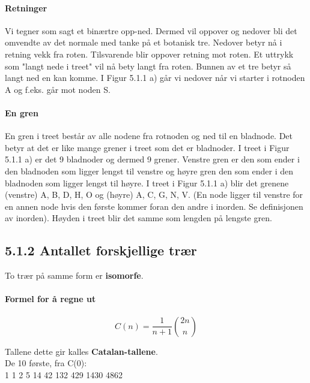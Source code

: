 \documentclass[11pt]{article}
\begin{document}
            \paragraph{Retninger}
            Vi tegner som sagt et binærtre opp-ned. Dermed vil oppover og nedover bli det
            omvendte av det normale med tanke på et botanisk tre. Nedover betyr nå i retning vekk fra
            roten. Tilsvarende blir oppover retning mot roten. Et uttrykk som "langt nede i treet" vil nå
            bety langt fra roten. Bunnen av et tre betyr så langt ned en kan komme. I Figur 5.1.1 a) går
            vi nedover når vi starter i rotnoden A og f.eks. går mot noden S.

            \paragraph{En gren}
            En gren i treet består av alle nodene fra rotnoden og ned til en bladnode. Det betyr at det er
            like mange grener i treet som det er bladnoder. I treet i Figur 5.1.1 a) er det 9 bladnoder og
            dermed 9 grener. Venstre gren er den som ender i den bladnoden som ligger lengst til
            venstre og høyre gren den som ender i den bladnoden som ligger lengst til høyre. I treet i
            Figur 5.1.1 a) blir det grenene (venstre) A, B, D, H, O og (høyre) A, C, G, N, V. (En node
            ligger til venstre for en annen node hvis den første kommer foran den andre i inorden. Se
            definisjonen av inorden). Høyden i treet blir det samme som lengden på lengste gren.

\newpage

    \subsection{5.1.2 Antallet forskjellige trær}
    To trær på samme form er \textbf{isomorfe}.

        \paragraph{Formel for å regne ut}

        \begin{multicols}{2}
            \begin{equation}
                C(n) = \frac{1}{n+1}\binom{2n}{n}
            \end{equation}
            
            \columnbreak

            Tallene dette gir kalles \textbf{Catalan-tallene}.\\
            De 10 første, fra C(0): \\
            1 1 2 5 14 42 132 429 1430 4862

        \end{multicols}
\end{document}
